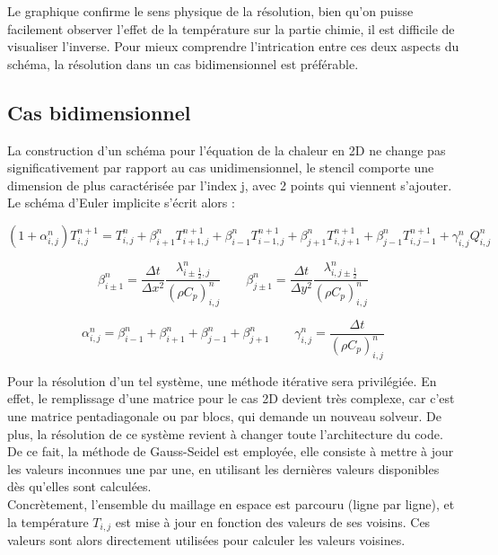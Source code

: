 \documentclass[a4paper,11pt]{article}
\begin{document}
Le graphique confirme le sens physique de la résolution, bien qu'on puisse facilement observer l'effet de la température sur la partie chimie, il est difficile de visualiser l'inverse. Pour mieux comprendre l'intrication entre ces deux aspects du schéma, la résolution dans un cas bidimensionnel est préférable.

\subsection{Cas bidimensionnel}

La construction d'un schéma pour l'équation de la chaleur en 2D ne change pas significativement par rapport au cas unidimensionnel, le stencil comporte une dimension de plus caractérisée par l'index j, avec 2 points qui viennent s'ajouter. Le schéma d'Euler implicite s'écrit alors :

\begin{equation}\label{CouplageEI2D}
    (1 + \alpha_{i,j}^n) T_{i,j}^{n+1} = T_{i,j}^{n} + \beta_{i+1}^{n} T_{i+1,j}^{n+1} + \beta_{i-1}^{n} T_{i-1,j}^{n+1} + \beta_{j+1}^{n} T_{i,j+1}^{n+1} + \beta_{j-1}^{n} T_{i,j-1}^{n+1} + \gamma_{i,j}^n Q_{i,j}^n
\end{equation}

\[
\beta_{i\pm1}^n = \frac{\Delta t}{\Delta x^2} \frac{\lambda_{i \pm \frac{1}{2}, j}^n}{(\rho C_p)_{i,j}^n}
\qquad
\beta_{j\pm1}^n = \frac{\Delta t}{\Delta y^2} \frac{\lambda_{i, j \pm \frac{1}{2}}^n}{(\rho C_p)_{i,j}^n}
\]

\[
\alpha_{i,j}^n = \beta_{i-1}^n + \beta_{i+1}^n + \beta_{j-1}^n + \beta_{j+1}^n
\qquad
\gamma_{i,j}^n = \frac{\Delta t}{(\rho C_p)_{i,j}^n}
\]

Pour la résolution d'un tel système, une méthode itérative sera privilégiée. En effet, le remplissage d'une matrice pour le cas 2D devient très complexe, car c'est une matrice pentadiagonale ou par blocs, qui demande un nouveau solveur. De plus, la résolution de ce système revient à changer toute l'architecture du code. De ce fait, la méthode de Gauss-Seidel est employée, elle consiste à mettre à jour les valeurs inconnues une par une, en utilisant les dernières valeurs disponibles dès qu’elles sont calculées. \\

Concrètement, l'ensemble du maillage en espace est parcouru (ligne par ligne), et la température $T_{i,j}$ est mise à jour en fonction des valeurs de ses voisins. Ces valeurs sont alors directement utilisées pour calculer les valeurs voisines. \\
\end{document}
